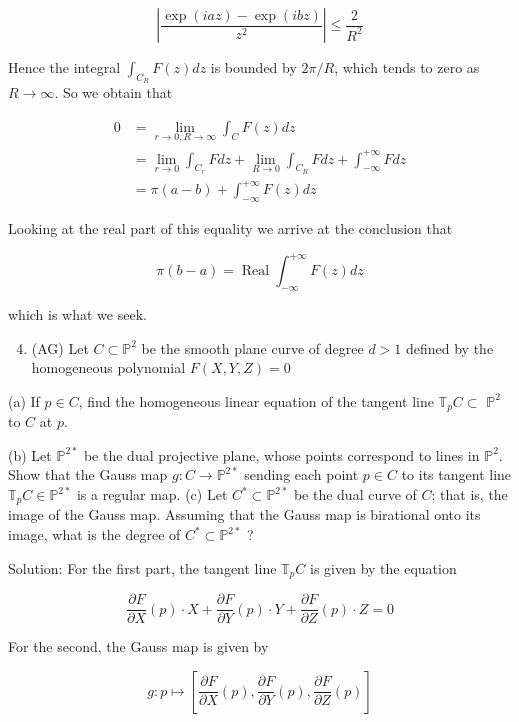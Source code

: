 \documentclass[10pt]{article}
\begin{document}
$$
\left|\frac{\exp (i a z)-\exp (i b z)}{z^{2}}\right| \leq \frac{2}{R^{2}}
$$

Hence the integral $\int_{C_{R}} F(z) d z$ is bounded by $2 \pi / R$, which tends to zero as $R \rightarrow \infty$. So we obtain that

$$
\begin{aligned}
0 & =\lim _{r \rightarrow 0, R \rightarrow \infty} \int_{C} F(z) d z \\
& =\lim _{r \rightarrow 0} \int_{C_{r}} F d z+\lim _{R \rightarrow 0} \int_{C_{R}} F d z+\int_{-\infty}^{+\infty} F d z \\
& =\pi(a-b)+\int_{-\infty}^{+\infty} F(z) d z
\end{aligned}
$$

Looking at the real part of this equality we arrive at the conclusion that

$$
\pi(b-a)=\operatorname{Real} \int_{-\infty}^{+\infty} F(z) d z
$$

which is what we seek.

\begin{enumerate}
  \setcounter{enumi}{3}
  \item (AG) Let $C \subset \mathbb{P}^{2}$ be the smooth plane curve of degree $d>1$ defined by the homogeneous polynomial $F(X, Y, Z)=0$
\end{enumerate}

(a) If $p \in C$, find the homogeneous linear equation of the tangent line $\mathbb{T}_{p} C \subset$ $\mathbb{P}^{2}$ to $C$ at $p$.

(b) Let $\mathbb{P}^{2 *}$ be the dual projective plane, whose points correspond to lines in $\mathbb{P}^{2}$. Show that the Gauss map $g: C \rightarrow \mathbb{P}^{2 *}$ sending each point $p \in C$ to its tangent line $\mathbb{T}_{p} C \in \mathbb{P}^{2 *}$ is a regular map.
(c) Let $C^{*} \subset \mathbb{P}^{2 *}$ be the dual curve of $C$; that is, the image of the Gauss map. Assuming that the Gauss map is birational onto its image, what is the degree of $C^{*} \subset \mathbb{P}^{2 *}$ ?

Solution: For the first part, the tangent line $\mathbb{T}_{p} C$ is given by the equation

$$
\frac{\partial F}{\partial X}(p) \cdot X+\frac{\partial F}{\partial Y}(p) \cdot Y+\frac{\partial F}{\partial Z}(p) \cdot Z=0
$$

For the second, the Gauss map is given by

$$
g: p \mapsto\left[\frac{\partial F}{\partial X}(p), \frac{\partial F}{\partial Y}(p), \frac{\partial F}{\partial Z}(p)\right]
$$
\end{document}
